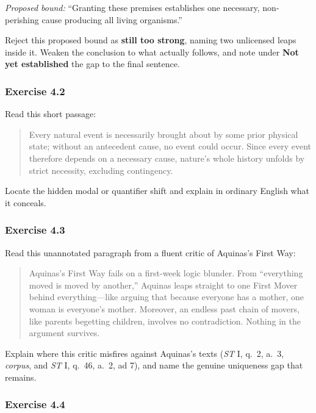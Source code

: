 \emph{Proposed bound:} ``Granting these premises establishes one necessary, non-perishing cause producing all living organisms.''

Reject this proposed bound as \textbf{still too strong}, naming two unlicensed leaps inside it. Weaken the conclusion to what actually follows, and note under \textbf{Not yet established} the gap to the final sentence.

\subsubsection*{Exercise 4.2}

Read this short passage:

\begin{quote}
Every natural event is necessarily brought about by some prior physical state; without an antecedent cause, no event could occur. Since every event therefore depends on a necessary cause, nature's whole history unfolds by strict necessity, excluding contingency.
\end{quote}

Locate the hidden modal or quantifier shift and explain in ordinary English what it conceals.

\subsubsection*{Exercise 4.3}

Read this unannotated paragraph from a fluent critic of Aquinas's First Way:

\begin{quote}
Aquinas's First Way fails on a first-week logic blunder. From ``everything moved is moved by another,'' Aquinas leaps straight to one First Mover behind everything---like arguing that because everyone has a mother, one woman is everyone's mother. Moreover, an endless past chain of movers, like parents begetting children, involves no contradiction. Nothing in the argument survives.
\end{quote}

Explain where this critic misfires against Aquinas's texts (\emph{ST} I, q.\ 2, a.\ 3, \emph{corpus}, and \emph{ST} I, q.\ 46, a.\ 2, ad 7), and name the genuine uniqueness gap that remains.

\subsubsection*{Exercise 4.4}

